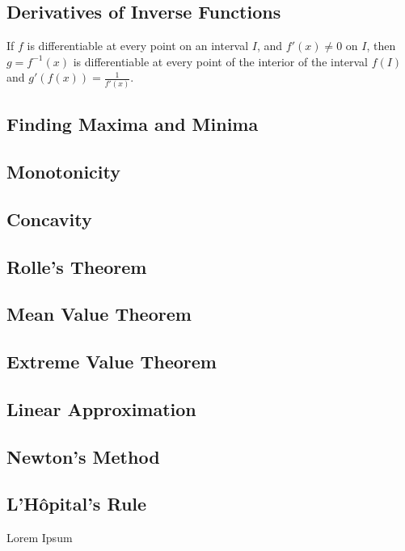 \documentclass{artikel3}
\begin{document}
\subsection{Derivatives of Inverse Functions}\label{dinv}
If $f$ is differentiable at every point on an interval $I$, and $f'(x)\neq 0$
on $I$, then $g=f^{-1}(x)$ is differentiable at every point of the interior of
the interval $f(I)$ and $g'(f(x))=\frac{1}{f'(x)}$.

\subsection{Finding Maxima and Minima}

\subsection{Monotonicity}

\subsection{Concavity}

\subsection{Rolle's Theorem}

\subsection{Mean Value Theorem}

\subsection{Extreme Value Theorem}

\subsection{Linear Approximation}

\subsection{Newton's Method}

\subsection{L'H\^{o}pital's Rule}

Lorem Ipsum
\end{document}
